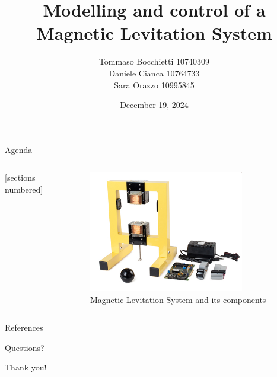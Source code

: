\documentclass[9pt]{beamer}
\title{Modelling and control of a Magnetic Levitation System}
\date{December 19, 2024}
\author{Tommaso Bocchietti 10740309 \\ Daniele Cianca 10764733 \\ Sara Orazzo 10995845}
\institute{Politecnico di Milano}
\begin{document}
\maketitle

\begin{frame}{Agenda}

    \begin{columns}[c, onlytextwidth]

        \begin{column}{0.4\textwidth}

            [sections numbered]
            \tableofcontents

        \end{column}

        \begin{column}{0.6\textwidth}

            \begin{figure}[H]
                \centering
                \includegraphics[width=0.8\textwidth]{img/maglev_and_components.jpg}
                \caption{Magnetic Levitation System and its components}
            \end{figure}

        \end{column}

    \end{columns}

\end{frame}





% 
% 
% 
% 
% 

\appendix

\begin{frame}[allowframebreaks]{References}
    \nocite{*}
    
\end{frame}

\begin{frame}[standout]
    Questions?
\end{frame}

\begin{frame}[standout]
    Thank you!
\end{frame}
\end{document}
